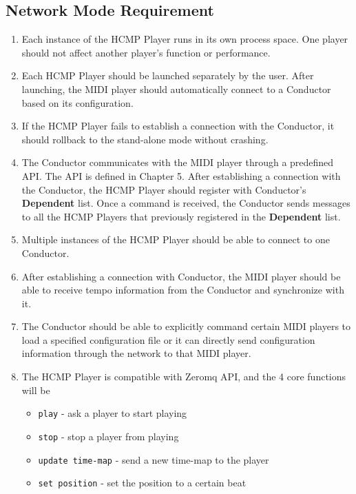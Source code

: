 \subsection{Network Mode Requirement}
\begin{enumerate}
  \item Each instance of the HCMP Player runs in its own process space. One player 
        should not affect another player's function or performance. 
        
  \item Each HCMP Player should be launched separately by the user. After 
        launching, the MIDI player should automatically connect to a Conductor 
        based on its configuration.

  \item If the HCMP Player fails to establish a connection with the Conductor, 
        it should rollback to the stand-alone mode without crashing.

  \item The Conductor communicates with the MIDI player through a predefined API. 
        The API is defined in Chapter 5. After establishing a connection with 
        the Conductor, the HCMP Player should register with Conductor's 
        {\bf Dependent} list. Once a command is received, the Conductor sends 
        messages to all the HCMP Players that previously registered in the 
        {\bf Dependent} list. 

  \item Multiple instances of the HCMP Player should be able to connect to one Conductor. 
  \item After establishing a connection with Conductor, the MIDI player 
        should be able to receive tempo information from the Conductor and 
        synchronize with it.     
  \item The Conductor should be able to explicitly command certain MIDI players to 
        load a specified configuration file or it can directly 
        send configuration information through the network to that MIDI player.
  \item 
    The HCMP Player is compatible with Zeromq \cite{zeromq} API, 
    and the 4 core functions will be
    \begin{itemize}
      \item \texttt{play} - ask a player to start playing 
      \item \texttt{stop} - stop a player from playing 
      \item \texttt{update time-map} - send a new time-map to the player 
      \item \texttt{set position} - set the position to a certain beat 
    \end{itemize}
\end{enumerate}

